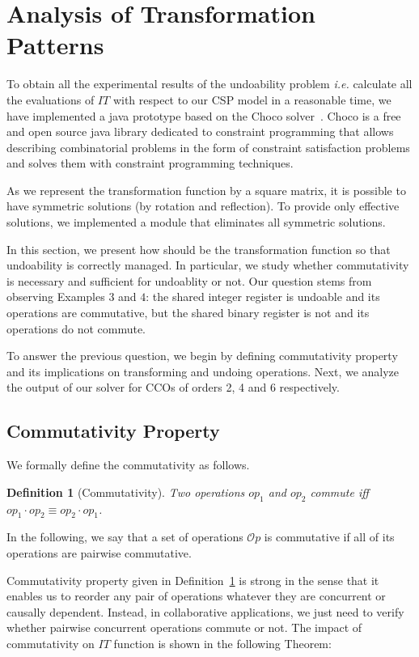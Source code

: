 \documentclass[submission,copyright,creativecommons]{eptcs}
\newtheorem{definition}{Definition}
\begin{document}
\section{Analysis of Transformation Patterns}

To obtain all the experimental results of the undoability problem \textit{i.e.} calculate all the evaluations of $IT$ with respect to our CSP model  
in a reasonable time, we have implemented a java prototype based on  the  Choco solver~\cite{choco}. Choco is a free and open source java library dedicated to constraint programming that allows describing combinatorial problems in the form of constraint satisfaction problems and solves them with constraint programming techniques. 

As we represent the transformation function by a square matrix, it is possible to have symmetric solutions (by rotation and reflection). To provide only effective solutions, we implemented a module that eliminates all symmetric solutions. 

In this section, we present how should be the transformation function so that undoability is correctly managed. 
In particular, we study whether commutativity is necessary and sufficient for undoablity or not. Our question stems from observing Examples $3$ and $4$: the shared integer register is undoable and its operations are commutative,
but the shared binary register is not   and its operations do not commute.

To answer the previous question, we begin by defining commutativity property and its implications on
transforming and undoing operations. Next, we analyze the output of our solver for CCOs of orders 2, 4 and 6 respectively.

\subsection{Commutativity Property}




We formally define the commutativity as follows.
\begin{definition}[Commutativity]\label{def:commutativity}
Two  operations  $op_1$ and $op_2$   commute iff  $  op_1\cdot op_2 \equiv  op_2 \cdot op_1$.
\end{definition}

In the following, we say that a set of operations $\mathcal{O}p$ is commutative if all of its operations are pairwise commutative.

Commutativity property given in Definition~\ref{def:commutativity} is strong in the sense that it enables us to reorder
any pair of operations whatever they are concurrent or causally dependent. Instead, in collaborative applications, we just need  to verify whether pairwise concurrent operations commute or not.
The impact of commutativity on $IT$ function  is shown in the following Theorem:
\end{document}

